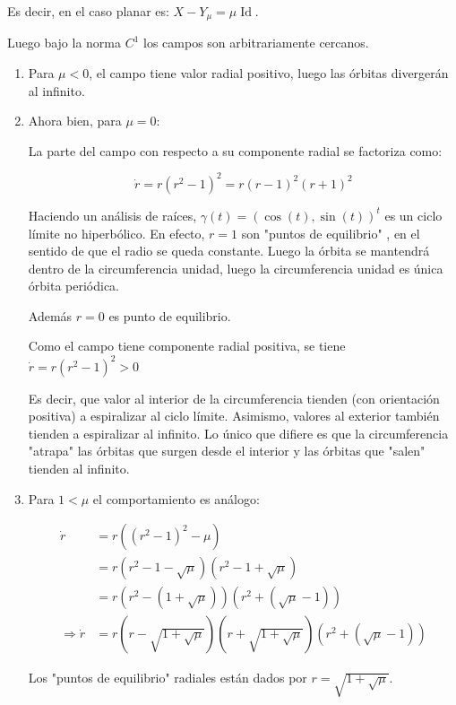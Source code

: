 \begin{exmp}
	Es decir, en el caso planar es: $X - Y_\mu = \mu \operatorname{Id}$.
	
	Luego bajo la norma $C^1$ los campos son arbitrariamente cercanos.
	
	\begin{enumerate}
		\item Para $\mu < 0$, el campo tiene valor radial positivo, luego las órbitas divergerán al infinito. 
		
		\item Ahora bien, para $\mu = 0$: 
		
		La parte del campo con respecto a su componente radial se factoriza como: 
		
		\begin{equation*}
			\dot{r} = r (r^2 -1)^2 = r(r-1)^2 (r+1)^2
		\end{equation*}
		
		Haciendo un análisis de raíces, $\gamma(t) = (\cos(t),\sin(t))^{t}$ es un ciclo límite no hiperbólico. En efecto, $r = 1$ son "puntos de equilibrio"  , en el sentido de que el radio se queda constante. Luego la órbita se mantendrá dentro de la circumferencia unidad, luego la circumferencia unidad es única órbita periódica. 
		
		Además $r = 0$ es punto de equilibrio.
		
		Como el campo tiene componente radial positiva, se tiene $\dot{r} = r(r^2-1)^2 > 0$
		
		Es decir, que valor al interior de la circumferencia tienden (con orientación positiva) a espiralizar al ciclo límite. Asimismo, valores al exterior también tienden a espiralizar al infinito. Lo único que difiere es que la circumferencia "atrapa" las órbitas que surgen desde el interior y las órbitas que "salen" tienden al infinito.
		
		
		\item Para $1 < \mu  $ el comportamiento es análogo: 
		
		\begin{align*}
			\dot{r} &= r ((r^2 -1)^2 - \mu ) \\ 
			&= r(r^2-1 - \sqrt{\mu}) (r^2-1 + \sqrt{\mu}) \\
			&= r(r^2-(1+ \sqrt{\mu} )) (r^2 + (\sqrt{\mu}-1))\\
			\Rightarrow \dot{r} &= r(r - \sqrt{1 + \sqrt{\mu} })(r + \sqrt{1 + \sqrt{\mu} })(r^2 + (\sqrt{\mu}-1))
		\end{align*}
		
		Los "puntos de equilibrio" radiales están dados por $r = \sqrt{ 1 + \sqrt{\mu}}$. 
		

\end{enumerate}
\end{exmp}
